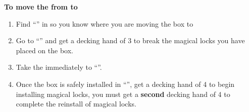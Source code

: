 \documentclass[green]{NeptuneBall}
\begin{document}
{\bf To move the \iMusicBox{} from \sPacketC{\MYloc{}} to \sPacketD{\MYloc{}}}
\begin{enumerate}
  \item Find ``\sPacketD{}'' in \sPacketD{\MYloc{}} so you know where you are moving the box to
  \item Go to ``\sPacketC{}'' and get a decking hand of 3 to break the magical locks you have placed on the box. 
  \item Take the \iMusicBox{} immediately to ``\sPacketD{}''. 
  \item Once the box is safely installed in ``\sPacketD{}'', get a decking hand of 4 to begin installing magical locks, you must get a {\bf second} decking hand of 4 to complete the reinstall of magical locks.
\end{enumerate}
\end{document}
